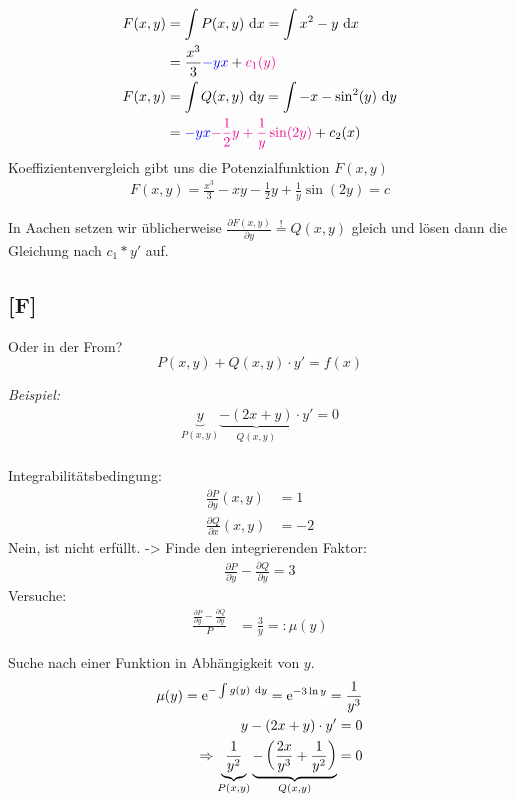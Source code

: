 \documentclass[main.tex]{subfiles}
\begin{document}
\begin{align*}
	F(x,y) &= \int P(x,y) ~\mathrm{d}x = \int x^2 -y ~\mathrm{d}x \\
		&= \frac{x^3}{3} \textcolor{blue}{-y x} + \textcolor{magenta}{c_1(y)} \\
	F(x,y) &= \int Q(x,y) ~\mathrm{d}y = \int -x - \sin^2(y) ~\mathrm{d}y \\
		&= \textcolor{blue}{-y x} \textcolor{magenta}{-\frac{1}{2}y + \frac{1}{y} \sin(2 y)} + c_2(x)\\
\end{align*}
Koeffizientenvergleich gibt uns die Potenzialfunktion $F(x,y)$
\begin{align*}
	F(x,y) = \frac{x^3}{3} -xy -\frac{1}{2}y + \frac{1}{y} \sin(2 y) = c
\end{align*}

In Aachen setzen wir üblicherweise $\frac{\partial F(x,y)}{\partial y} \overset{!}{=} Q(x,y)$ gleich und lösen dann die Gleichung nach $c_1 * y'$ auf.

\subsection{[F]}
\vspace{6cm}
Oder in der From? 
$$
	P(x,y) + Q(x,y)\cdot y' = f(x)
$$

\textit{Beispiel:}
\begin{align*}
	\underbrace{y}_{P(x,y)} \underbrace{- (2x +y)}_{Q(x,y)} \cdot y' = 0 \\
\end{align*}

Integrabilitätsbedingung:
\begin{align*}
	\frac{\partial P}{\partial y}(x,y) &= 1 \\
	\frac{\partial Q}{\partial x}(x,y) &= -2 
\end{align*}
Nein, ist nicht erfüllt. 
-> Finde den integrierenden Faktor:
\begin{align*}
	\frac{\partial P}{\partial y} - \frac{\partial Q}{\partial y} = 3
\end{align*}
Versuche: 
\begin{align*}
	\frac{\frac{\partial P}{\partial y} - \frac{\partial Q}{\partial y}}{P} 
	&= \frac{3}{y} =: \mu(y)
\end{align*}

Suche nach einer Funktion in Abhängigkeit von $y$. 
\begin{align*}
	\mu(y) = \operatorname{\mathrm{e}}^{-\int g(y)~\mathrm{d}y} = \operatorname{\mathrm{e}}^{-3\ln y} = \frac{1}{y^3} \\
	y-(2x +y) \cdot y' = 0 \\
	\Rightarrow \underbrace{\frac{1}{y^2}}_{P(x,y)} \underbrace{ -\left(\frac{2x}{y^3} + \frac{1}{y^2} \right)}_{Q(x,y)} = 0
\end{align*}
\end{document}

